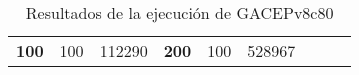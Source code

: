 \begin{table}[H]
\begin{tabular}{|ccrccrccc}
\multicolumn{1}{|c|}{\multirow{-39}{*}{\cellcolor[HTML]{FFFFC7}\textbf{100}}} & \multicolumn{1}{c|}{\multirow{-9}{*}{\cellcolor[HTML]{DDFDFF}100}} & \multicolumn{1}{r|}{\cellcolor[HTML]{DAE8FC}112290}    & \multicolumn{1}{c|}{\multirow{-39}{*}{\cellcolor[HTML]{FFFFC7}\textbf{200}}} & \multicolumn{1}{c|}{\multirow{-10}{*}{\cellcolor[HTML]{DDFDFF}100}} & \multicolumn{1}{r|}{\cellcolor[HTML]{DDFDFF}528967}    &                                                                              &                                                                    &                                                        \\ \cline{1-6}
\end{tabular}
\caption{\label{res:GACEPv8c80}Resultados de la ejecución de GACEPv8c80}
\end{table}

